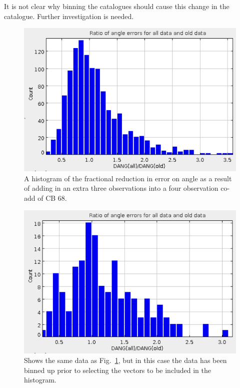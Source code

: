 \documentclass[twoside,11pt]{starlink}
\begin{document}
It is not clear why binning the catalogues should cause this change in
the catalogue. Further investigation is needed.

\begin{figure}
\includegraphics[width=\columnwidth]{error1}
\caption{A histogram of the fractional reduction in error on angle
as a result of adding in an extra three observations into a four
observation co-add of CB 68.}
\label{fig:error1}
\end{figure}

\begin{figure}
\includegraphics[width=\columnwidth]{error2}
\caption{Shows the same data as Fig.~\ref{fig:error1}, but in this case
the data has been binned up prior to selecting the vectors to be included
in the histogram.}
\label{fig:error2}
\end{figure}
\end{document}
